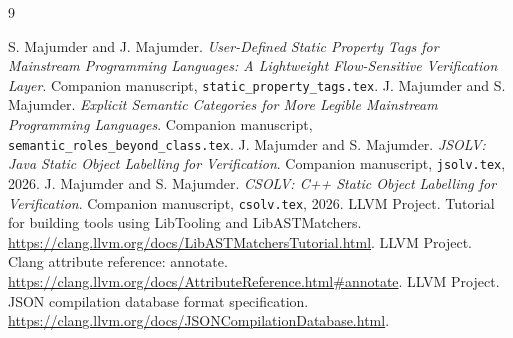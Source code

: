 \documentclass[11pt]{article}
\begin{document}
\begin{thebibliography}{9}
\raggedright
{} S. Majumder and J. Majumder.
\emph{User-Defined Static Property Tags for Mainstream Programming Languages:
A Lightweight Flow-Sensitive Verification Layer}. Companion manuscript,
\texttt{static\_property\_tags.tex}.
 J. Majumder and S. Majumder.
\emph{Explicit Semantic Categories for More Legible Mainstream Programming Languages}.
Companion manuscript, \texttt{semantic\_roles\_beyond\_class.tex}.
 J. Majumder and S. Majumder.
\emph{JSOLV: Java Static Object Labelling for Verification}.
Companion manuscript, \texttt{jsolv.tex}, 2026.
 J. Majumder and S. Majumder.
\emph{CSOLV: C++ Static Object Labelling for Verification}.
Companion manuscript, \texttt{csolv.tex}, 2026.
 LLVM Project.
Tutorial for building tools using LibTooling and LibASTMatchers.
\url{https://clang.llvm.org/docs/LibASTMatchersTutorial.html}.
 LLVM Project. Clang attribute reference: annotate.
\url{https://clang.llvm.org/docs/AttributeReference.html#annotate}.
 LLVM Project. JSON compilation database format specification.
\url{https://clang.llvm.org/docs/JSONCompilationDatabase.html}.
\end{thebibliography}
\end{document}
